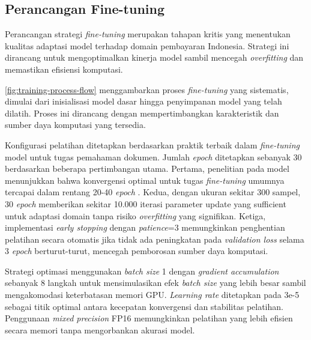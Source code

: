 \subsection{Perancangan Fine-tuning}
\label{subsec:perancangan-fine-tuning}

Perancangan strategi \emph{fine-tuning} merupakan tahapan kritis yang menentukan kualitas adaptasi model terhadap domain pembayaran Indonesia. Strategi ini dirancang untuk mengoptimalkan kinerja model sambil mencegah \emph{overfitting} dan memastikan efisiensi komputasi.


\autoref{fig:training-process-flow} menggambarkan proses \emph{fine-tuning} yang sistematis, dimulai dari inisialisasi model dasar hingga penyimpanan model yang telah dilatih. Proses ini dirancang dengan mempertimbangkan karakteristik \dataset{} dan sumber daya komputasi yang tersedia.

Konfigurasi pelatihan ditetapkan berdasarkan praktik terbaik dalam \emph{fine-tuning} model \transformer{} untuk tugas pemahaman dokumen. Jumlah \emph{epoch} ditetapkan sebanyak 30 berdasarkan beberapa pertimbangan utama. Pertama, penelitian pada model \donut{} menunjukkan bahwa konvergensi optimal untuk tugas \emph{fine-tuning} umumnya tercapai dalam rentang 20-40 \emph{epoch} \parencite{kim2021donut}. Kedua, dengan ukuran \dataset{} sekitar 300 sampel, 30 \emph{epoch} memberikan sekitar 10.000 iterasi parameter update yang sufficient untuk adaptasi domain tanpa risiko \emph{overfitting} yang signifikan. Ketiga, implementasi \emph{early stopping} dengan \emph{patience}=3 memungkinkan penghentian pelatihan secara otomatis jika tidak ada peningkatan pada \emph{validation loss} selama 3 \emph{epoch} berturut-turut, mencegah pemborosan sumber daya komputasi.

Strategi optimasi menggunakan \emph{batch size} 1 dengan \emph{gradient accumulation} sebanyak 8 langkah untuk mensimulasikan efek \emph{batch size} yang lebih besar sambil mengakomodasi keterbatasan memori GPU. \emph{Learning rate} ditetapkan pada 3e-5 sebagai titik optimal antara kecepatan konvergensi dan stabilitas pelatihan. Penggunaan \emph{mixed precision} FP16 memungkinkan pelatihan yang lebih efisien secara memori tanpa mengorbankan akurasi model.

